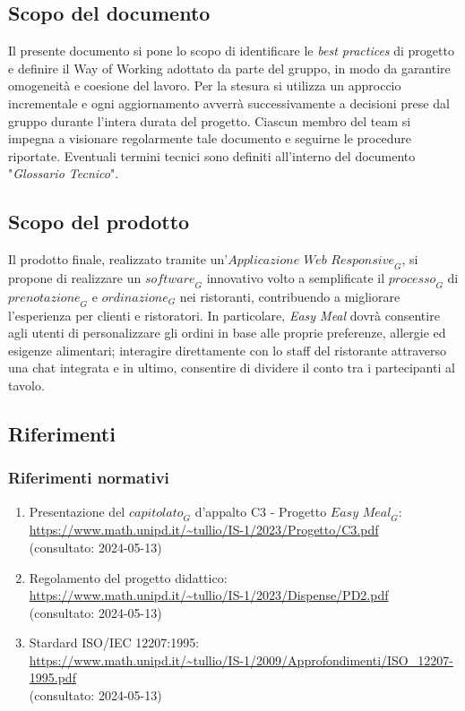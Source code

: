\subsection{Scopo del documento}
Il presente documento si pone lo scopo di identificare le \emph{best practices} di progetto e definire il Way of Working adottato da parte del gruppo, in modo da garantire omogeneità e coesione del lavoro. Per la stesura si utilizza un approccio incrementale e ogni aggiornamento avverrà successivamente a decisioni prese dal gruppo durante l'intera durata del progetto. Ciascun membro del team si impegna a visionare regolarmente tale documento e seguirne le procedure riportate.
Eventuali termini tecnici sono definiti all'interno del documento "\emph{Glossario Tecnico}".
\subsection{Scopo del prodotto}
Il prodotto finale, realizzato tramite un'$\textit{Applicazione Web Responsive}_G$, si propone di realizzare un $\textit{software}_G$ innovativo volto a semplificate il $\textit{processo}_G$ di $\textit{prenotazione}_G$ e $\textit{ordinazione}_G$ nei ristoranti, contribuendo a migliorare l'esperienza per clienti e ristoratori. In particolare, \textit{Easy Meal} dovrà consentire agli utenti di personalizzare gli ordini in base alle proprie preferenze, allergie ed esigenze alimentari; interagire direttamente con lo staff del ristorante attraverso una chat integrata e in ultimo, consentire di dividere il conto tra i partecipanti al tavolo.
\subsection{Riferimenti}
\subsubsection{Riferimenti normativi}
\begin{enumerate}
    \item Presentazione del $\textit{capitolato}_G$ d'appalto C3 - Progetto $\textit{Easy Meal}_G$: \\ \url{https://www.math.unipd.it/~tullio/IS-1/2023/Progetto/C3.pdf}\\
    (consultato: 2024-05-13)
    \item Regolamento del progetto didattico: \\ 
    \url{https://www.math.unipd.it/~tullio/IS-1/2023/Dispense/PD2.pdf}\\
    (consultato: 2024-05-13)
    \item Stardard ISO/IEC 12207:1995: \\
    \url{https://www.math.unipd.it/~tullio/IS-1/2009/Approfondimenti/ISO_12207-1995.pdf}\\(consultato: 2024-05-13)
\end{enumerate}
